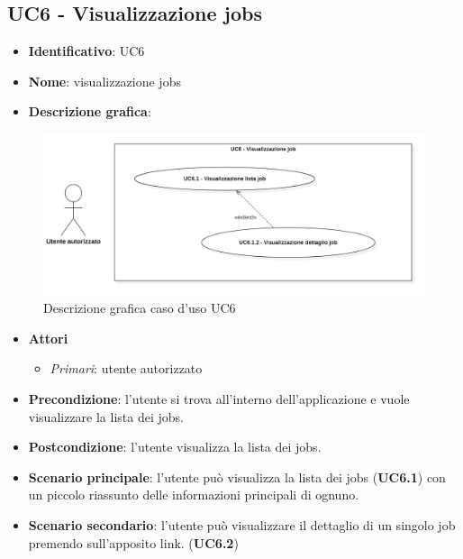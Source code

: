 
\subsection{UC6 - Visualizzazione jobs}
\begin{itemize}
  \item \textbf{Identificativo}: UC6
  \item \textbf{Nome}: visualizzazione jobs
  \item \textbf{Descrizione grafica}:
\end{itemize}

\begin{figure}[h]
  \centering
  \includegraphics[scale=1.5]{immagini/usecase/UC6.png}
  \caption{Descrizione grafica caso d'uso UC6}
\end{figure}

\begin{itemize}
  \item \textbf{Attori}
        \begin{itemize}
          \item \textit{Primari}: utente autorizzato
        \end{itemize}
  \item \textbf{Precondizione}: l'utente si trova all'interno dell'applicazione e vuole visualizzare la lista dei jobs.
  \item \textbf{Postcondizione}: l'utente visualizza la lista dei jobs.
  \item \textbf{Scenario principale}: l'utente può visualizza la lista dei jobs (\textbf{UC6.1}) con un piccolo riassunto delle informazioni principali di ognuno.
  \item \textbf{Scenario secondario}: l'utente può visualizzare il dettaglio di un singolo job premendo sull'apposito link. (\textbf{UC6.2})
\end{itemize}

